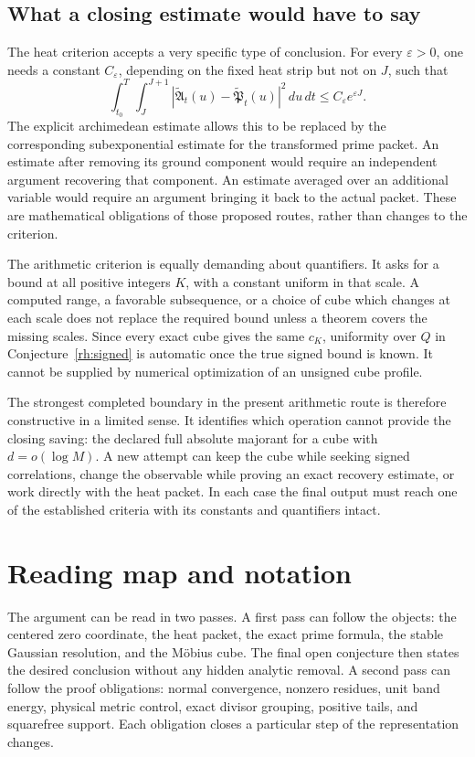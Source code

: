 \subsection{What a closing estimate would have to say}

The heat criterion accepts a very specific type of conclusion. For every \(\varepsilon>0\), one needs a constant \(C_\varepsilon\), depending on the fixed heat strip but not on \(J\), such that
\[
\int_{t_0}^T\int_J^{J+1}
|\widetilde{\mathfrak A}_t(u)-
\widetilde{\mathfrak P}_t(u)|^2\,du\,dt
\le C_\varepsilon e^{\varepsilon J}.
\]
The explicit archimedean estimate allows this to be replaced by the corresponding subexponential estimate for the transformed prime packet. An estimate after removing its ground component would require an independent argument recovering that component. An estimate averaged over an additional variable would require an argument bringing it back to the actual packet. These are mathematical obligations of those proposed routes, rather than changes to the criterion.

The arithmetic criterion is equally demanding about quantifiers. It asks for a bound at all positive integers \(K\), with a constant uniform in that scale. A computed range, a favorable subsequence, or a choice of cube which changes at each scale does not replace the required bound unless a theorem covers the missing scales. Since every exact cube gives the same \(c_K\), uniformity over \(Q\) in Conjecture~\ref{rh:signed} is automatic once the true signed bound is known. It cannot be supplied by numerical optimization of an unsigned cube profile.

The strongest completed boundary in the present arithmetic route is therefore constructive in a limited sense. It identifies which operation cannot provide the closing saving: the declared full absolute majorant for a cube with \(d=o(\log M)\). A new attempt can keep the cube while seeking signed correlations, change the observable while proving an exact recovery estimate, or work directly with the heat packet. In each case the final output must reach one of the established criteria with its constants and quantifiers intact.

\section{Reading map and notation}

The argument can be read in two passes. A first pass can follow the objects: the centered zero coordinate, the heat packet, the exact prime formula, the stable Gaussian resolution, and the Möbius cube. The final open conjecture then states the desired conclusion without any hidden analytic removal. A second pass can follow the proof obligations: normal convergence, nonzero residues, unit band energy, physical metric control, exact divisor grouping, positive tails, and squarefree support. Each obligation closes a particular step of the representation changes.

